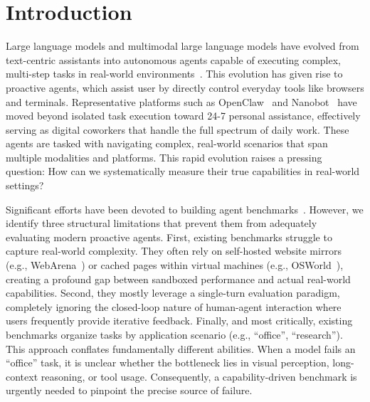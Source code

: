 \section{Introduction}
Large language models and multimodal large language models have evolved
from text-centric assistants into autonomous agents capable of executing
complex, multi-step tasks in real-world
environments~\citep{yao2022react,schick2023toolformer}.
This evolution has given rise to proactive
agents, which assist user by directly control everyday tools like browsers and terminals.
Representative platforms such as OpenClaw~\citep{openclaw}
and Nanobot~\citep{nanobot} have moved beyond isolated task execution toward
24-7 personal assistance, effectively serving as digital coworkers
that handle the full spectrum of daily work. These agents are tasked with navigating complex, real-world scenarios that span multiple modalities and platforms. This rapid evolution raises a pressing question: How can we systematically measure their true capabilities in real-world settings?

Significant efforts have been devoted to building agent benchmarks~\cite{liu2023agentbench,mialon2023gaia}. However, we identify three structural limitations that prevent them from adequately evaluating modern proactive agents. First, existing benchmarks struggle to capture real-world complexity. They often rely on self-hosted website mirrors (e.g., WebArena~\cite{zhou2023webarena}) or cached pages within virtual machines (e.g., OSWorld~\cite{xie2024osworld}), creating a profound gap between sandboxed performance and actual real-world capabilities. Second, they mostly leverage a single-turn evaluation paradigm, completely ignoring the closed-loop nature of human-agent interaction where users frequently provide iterative feedback. Finally, and most critically, existing benchmarks organize tasks by application scenario (e.g., ``office'', ``research''). This approach conflates fundamentally different abilities. When a model fails an ``office'' task, it is unclear whether the bottleneck lies in visual perception, long-context reasoning, or tool usage. Consequently, a capability-driven benchmark is urgently needed to pinpoint the precise source of failure. 

